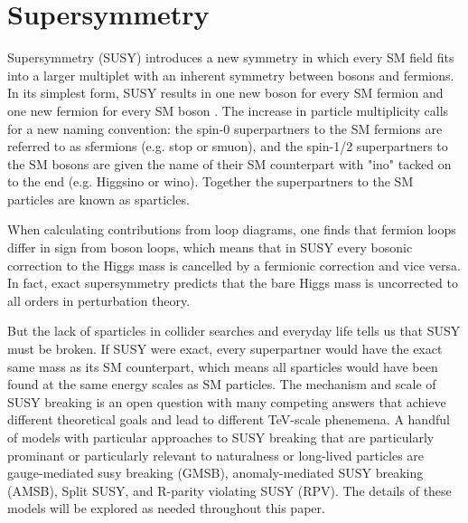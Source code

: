 \documentclass[12pt]{article}
\begin{document}
    
\section{Supersymmetry}
    Supersymmetry (SUSY) introduces a new symmetry in which every SM field fits into a larger multiplet with an inherent symmetry between bosons and fermions. In its simplest form, SUSY results in one new boson for every SM fermion and one new fermion for every SM boson . The increase in particle multiplicity calls for a new naming convention: the spin-0 superpartners to the SM fermions are referred to as sfermions (e.g. stop or smuon), and the spin-1/2 superpartners to the SM bosons are given the name of their SM counterpart with "ino" tacked on to the end (e.g. Higgsino or wino). Together the superpartners to the SM particles are known as sparticles. 

    When calculating contributions from loop diagrams, one finds that fermion loops differ in sign from boson loops, which means that in SUSY every bosonic correction to the Higgs mass is cancelled by a fermionic correction and vice versa. In fact, exact supersymmetry predicts that the bare Higgs mass is uncorrected to all orders in perturbation theory. 

    But the lack of sparticles in collider searches and everyday life tells us that SUSY must be broken. If SUSY were exact, every superpartner would have the exact same mass as its SM counterpart, which means all sparticles would have been found at the same energy scales as SM particles. The mechanism and scale of SUSY breaking is an open question with many competing answers that achieve different theoretical goals and lead to different TeV-scale phenemena. A handful of models with particular approaches to SUSY breaking that are particularly prominant or particularly relevant to naturalness or long-lived particles are gauge-mediated susy breaking (GMSB), anomaly-mediated SUSY breaking (AMSB), Split SUSY, and R-parity violating SUSY (RPV). The details of these models will be explored as needed throughout this paper.
\end{document}
